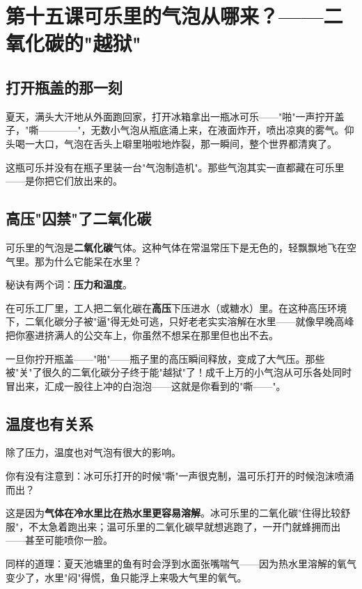 \documentclass[a4paper,12pt]{ctexart}
\begin{document}
\newpage

\section{\textcolor{orange!80!black}{第十五课\quad 可乐里的气泡从哪来？——二氧化碳的"越狱"}}

\subsection*{打开瓶盖的那一刻}

夏天，满头大汗地从外面跑回家，打开冰箱拿出一瓶冰可乐——"啪"一声拧开盖子，"嘶————"，无数小气泡从瓶底涌上来，在液面炸开，喷出凉爽的雾气。仰头喝一大口，气泡在舌头上噼里啪啦地炸裂，那一瞬间，整个世界都清爽了。

这瓶可乐并没有在瓶子里装一台"气泡制造机"。那些气泡其实一直都藏在可乐里——是你把它们放出来的。

\subsection*{高压"囚禁"了二氧化碳}

可乐里的气泡是\textbf{二氧化碳}气体。这种气体在常温常压下是无色的，轻飘飘地飞在空气里。那为什么它能呆在水里？

秘诀有两个词：\textbf{压力和温度}。

在可乐工厂里，工人把二氧化碳在\textbf{高压}下压进水（或糖水）里。在这种高压环境下，二氧化碳分子被"逼"得无处可逃，只好老老实实溶解在水里——就像早晚高峰把你塞进挤满人的公交车上，你虽然不想呆在那里但也出不去。

一旦你拧开瓶盖——"啪"——瓶子里的高压瞬间释放，变成了大气压。那些被"关"了很久的二氧化碳分子终于能"越狱"了！成千上万的小气泡从可乐各处同时冒出来，汇成一股往上冲的白泡泡——这就是你看到的"嘶——"。

\subsection*{温度也有关系}

除了压力，温度也对气泡有很大的影响。

你有没有注意到：冰可乐打开的时候"嘶"一声很克制，温可乐打开的时候泡沫喷涌而出？

这是因为\textbf{气体在冷水里比在热水里更容易溶解}。冰可乐里的二氧化碳"住得比较舒服"，不太急着跑出来；温可乐里的二氧化碳早就想逃跑了，一开门就蜂拥而出——甚至可能喷你一脸。

同样的道理：夏天池塘里的鱼有时会浮到水面张嘴喘气——因为热水里溶解的氧气变少了，水里"闷"得慌，鱼只能浮上来吸大气里的氧气。
\end{document}
